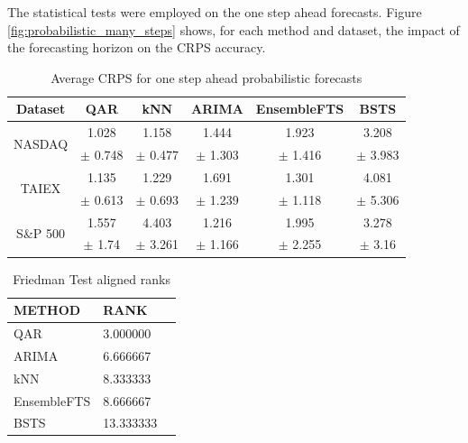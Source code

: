 The statistical tests were employed on the one step ahead forecasts. Figure \ref{fig:probabilistic_many_steps} shows, for each method and dataset, the impact of the forecasting horizon on the CRPS accuracy.

\begin{table}[htp]
    \centering
    \begin{tabular}{|c|ccccc|}
\hline
\textbf{ Dataset } & \textbf{ QAR } & \textbf{ kNN } & \textbf{ ARIMA } & \textbf{ EnsembleFTS } & \textbf{ BSTS } \\
\hline
\multirow{2}{*}{NASDAQ} &    1.028 &    1.158 &    1.444 &       1.923 &    3.208 \\
&  $\pm$ 0.748 &  $\pm$  0.477 &  $\pm$  1.303 &     $\pm$  1.416 &  $\pm$  3.983 \\ \hline
\multirow{2}{*}{TAIEX} &    1.135 &    1.229 &    1.691 &       1.301 &    4.081 \\
 &  $\pm$  0.613 &  $\pm$  0.693 &  $\pm$  1.239 &     $\pm$  1.118 &  $\pm$  5.306 \\ \hline
\multirow{2}{*}{S\&P 500} &    1.557 &    4.403 &    1.216 &       1.995 &    3.278 \\
&   $\pm$  1.74 &  $\pm$  3.261 &  $\pm$  1.166 &     $\pm$  2.255 &   $\pm$  3.16 \\ \hline
\end{tabular}
    \caption{Average CRPS for one step ahead probabilistic forecasts}
    \label{tab:prob_crps_results}
\end{table}

\begin{table}[htb]
    \centering
    \begin{tabular}{llr}
\toprule
METHOD &       RANK \\
\midrule
QAR &   3.000000 \\
ARIMA &   6.666667 \\
kNN &   8.333333 \\
EnsembleFTS &   8.666667 \\
BSTS &  13.333333 \\
\bottomrule
\end{tabular}
    \caption{Friedman Test aligned ranks}
    \label{tab:prob_crps_ranks}
\end{table}

